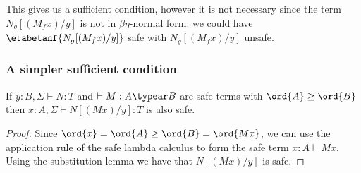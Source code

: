 This gives us a sufficient condition, however it is not necessary since the term $N_g[(M_f x)/y]$ is not in $\beta\eta$-normal form: we could have $\etabetanf{N_g[(M_f x) /y]}$ safe with $N_g[(M_f x) /y]$ unsafe.

\subsubsection{A simpler sufficient condition}
%
%
%
%

\begin{lemma}
If $y:B, \Sigma \vdash N : T$ and $\vdash M : A \typear B$ 
are safe terms with $\ord{A} \geq \ord{B}$
then $x:A, \Sigma \vdash N[(M x)/y] :T$ is also safe.
\end{lemma}
\begin{proof}
Since $\ord{x} = \ord{A} \geq \ord{B} = \ord{M x}$, we can use the application 
rule of the safe lambda calculus to form the safe term $x:A \vdash M x$.
Using the substitution lemma we have that $N[(M x)/y]$ is safe.
\end{proof}

